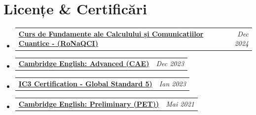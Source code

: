 \documentclass[a4paper,11pt]{article}
\makeatletter
\newcommand{\resumePOR}[3]{
\vspace{0.5mm}\item
    \begin{tabular*}{0.97\textwidth}[t]{l@{\extracolsep{\fill}}r}
        \textbf{#1}\hspace{0.3mm}#2 & \textit{\small{#3}} 
    \end{tabular*}
    \vspace{-2mm}
}
\newcommand{\resumeProject}[4]{
\vspace{0.5mm}\item
    \begin{tabular*}{0.98\textwidth}[t]{l@{\extracolsep{\fill}}r}
        \textbf{#1} & \textit{\footnotesize{#3}} \\
        \footnotesize{\textit{#2}} & \footnotesize{#4}
    \end{tabular*}
    \vspace{-2.4mm}
}
\newcommand{\resumeSubHeadingListStart}{\begin{itemize}[leftmargin=*,labelsep=1mm]}
\newcommand{\resumeItemListStart}{\begin{itemize}[leftmargin=*,labelsep=1mm,itemsep=0.5mm]}
\newcommand{\resumeSubHeadingListEnd}{\end{itemize}\vspace{2mm}}
\newcommand{\resumeItemListEnd}{\end{itemize}\vspace{-2mm}}
\makeatother
\begin{document}
\section{\textbf{Licențe \& Certificări}}
\vspace{-0.2mm}
\resumeSubHeadingListStart

\resumePOR{}{\href{https://drive.google.com/file/d/1WMnR9FlJT_pPSB15GxZpJTv662y901Cq/view?usp=sharing}{
\textbf{Curs de Fundamente ale Calculului și Comunicațiilor Cuantice - (RoNaQCI)}
}}{Dec 2024}

\resumePOR{}{\href{https://drive.google.com/file/d/1SCBSCP2LY4lAmFC1qx0hxTLmfbSR4jCO/view?usp=sharing}{
\textbf{Cambridge English: Advanced (CAE)}
}}{Dec 2023}

\resumePOR{}{\href{https://drive.google.com/file/d/1R3IxChVuiy-t4H5uhFsGPcKmu4DS51Wh/view?usp=sharing}{
\textbf{IC3 Certification - Global Standard 5)}
}}{Ian 2023}

\resumePOR{}{\href{https://drive.google.com/file/d/1SIY_7KhyOPoYnHBO6ikptXtp6GIHQ3-v/view?usp=sharing}{
\textbf{Cambridge English: Preliminary (PET))}
}}{Mai 2021}





\resumeSubHeadingListEnd
\vspace{-6mm}


\end{document}
